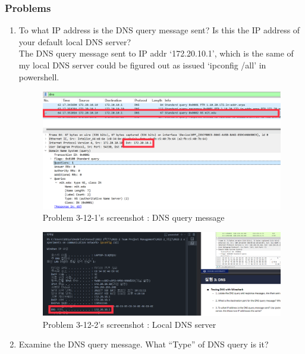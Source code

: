     \subsubsection*{Problems}
    \begin{enumerate}[label=\bfseries Problem \arabic*:,leftmargin=*,labelindent=1em]\addtocounter{enumi}{11}
        \item To what IP address is the DNS query message sent? 
        Is this the IP address of your default local DNS server?\\[0.2mm]
            \soln The DNS query message sent to IP addr ‘172.20.10.1’,
            which is the same of my local DNS server could be figured out as issued ‘ipconfig /all’ in powershell.
            \begin{figure}[!h]\centering
        		\includegraphics[width=.79\textwidth]{image/result_week01/Q3-c-1.png}
        		\caption{\footnotesize Problem 3-12-1's screenshot : DNS query message}
        		\vspace{-10pt}
            \end{figure}
            \begin{figure}[!h]\centering
        		\includegraphics[width=.79\textwidth]{image/result_week01/Q3-c-2.png}
        		\caption{\footnotesize Problem 3-12-2's screenshot : Local DNS server}
        		\vspace{-10pt}
            \end{figure}
        \item Examine the DNS query message. What “Type” of DNS query is it? 

\end{enumerate}
